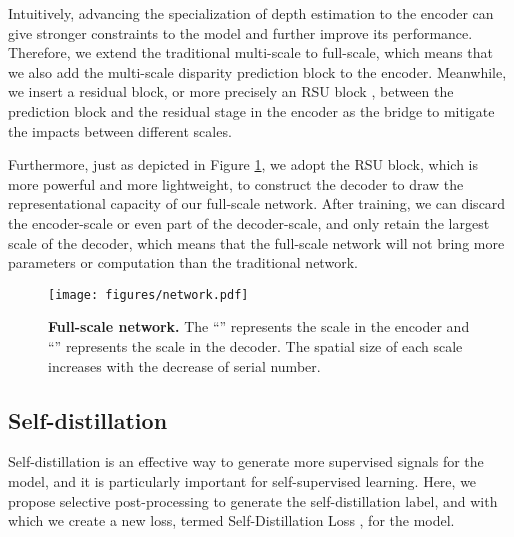 \documentclass[10pt,twocolumn,letterpaper]{article}
\begin{document}
Intuitively, advancing the specialization of depth estimation to the encoder can 
give stronger constraints to the model and further improve its performance. 
Therefore, we extend the traditional multi-scale 
to full-scale, which means that we also add the multi-scale disparity prediction block to 
the encoder. Meanwhile, we insert a residual block, or more precisely an RSU block 
\cite{Qin2020}, between the prediction block and the residual stage in the encoder 
as the bridge to mitigate the impacts between different scales.

Furthermore, just as depicted in Figure \ref{fig:network}, we adopt the RSU block, 
which is more powerful and more lightweight, to construct the decoder to draw the 
representational capacity of our full-scale network. After training, we can 
discard the encoder-scale or even part of the decoder-scale, 
and only retain the largest scale of the decoder, which means that the full-scale 
network will not bring more parameters or computation than the traditional network.

\begin{figure}[t]
   \begin{center}
      \texttt{[image: figures/network.pdf]}
   \end{center}
      \caption{{\bf Full-scale network.} The ``'' represents the scale in the 
      encoder and ``'' represents the scale in the decoder. The spatial 
      size of each scale increases with the decrease of serial number.}
   \label{fig:network}
\end{figure}

\subsection{Self-distillation} \label{sec:sd}

Self-distillation is an effective way to generate more supervised signals for 
the model, and it is particularly important for self-supervised learning. Here, 
we propose selective post-processing to generate the self-distillation label, 
and with which we create a new loss, termed Self-Distillation Loss , 
for the model.
\end{document}
